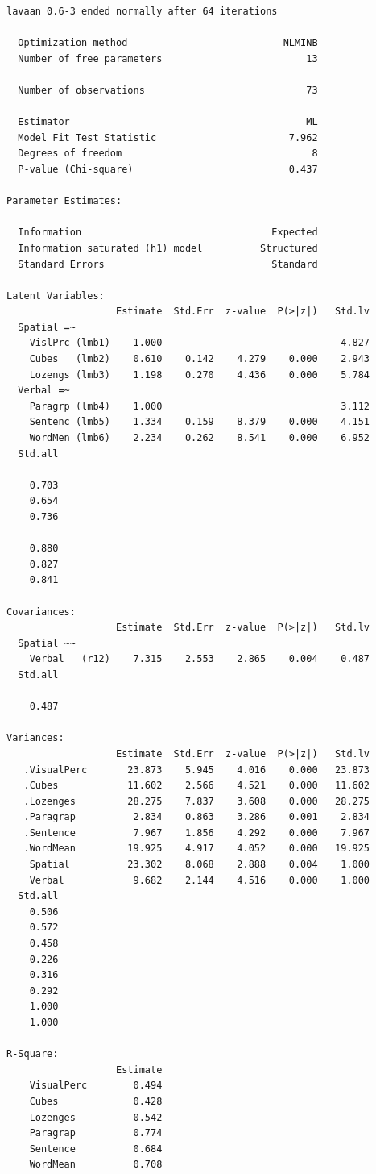 \begin{verbatim}
lavaan 0.6-3 ended normally after 64 iterations

  Optimization method                           NLMINB
  Number of free parameters                         13

  Number of observations                            73

  Estimator                                         ML
  Model Fit Test Statistic                       7.962
  Degrees of freedom                                 8
  P-value (Chi-square)                           0.437

Parameter Estimates:

  Information                                 Expected
  Information saturated (h1) model          Structured
  Standard Errors                             Standard

Latent Variables:
                   Estimate  Std.Err  z-value  P(>|z|)   Std.lv
  Spatial =~                                                   
    VislPrc (lmb1)    1.000                               4.827
    Cubes   (lmb2)    0.610    0.142    4.279    0.000    2.943
    Lozengs (lmb3)    1.198    0.270    4.436    0.000    5.784
  Verbal =~                                                    
    Paragrp (lmb4)    1.000                               3.112
    Sentenc (lmb5)    1.334    0.159    8.379    0.000    4.151
    WordMen (lmb6)    2.234    0.262    8.541    0.000    6.952
  Std.all
         
    0.703
    0.654
    0.736
         
    0.880
    0.827
    0.841

Covariances:
                   Estimate  Std.Err  z-value  P(>|z|)   Std.lv
  Spatial ~~                                                   
    Verbal   (r12)    7.315    2.553    2.865    0.004    0.487
  Std.all
         
    0.487

Variances:
                   Estimate  Std.Err  z-value  P(>|z|)   Std.lv
   .VisualPerc       23.873    5.945    4.016    0.000   23.873
   .Cubes            11.602    2.566    4.521    0.000   11.602
   .Lozenges         28.275    7.837    3.608    0.000   28.275
   .Paragrap          2.834    0.863    3.286    0.001    2.834
   .Sentence          7.967    1.856    4.292    0.000    7.967
   .WordMean         19.925    4.917    4.052    0.000   19.925
    Spatial          23.302    8.068    2.888    0.004    1.000
    Verbal            9.682    2.144    4.516    0.000    1.000
  Std.all
    0.506
    0.572
    0.458
    0.226
    0.316
    0.292
    1.000
    1.000

R-Square:
                   Estimate
    VisualPerc        0.494
    Cubes             0.428
    Lozenges          0.542
    Paragrap          0.774
    Sentence          0.684
    WordMean          0.708
\end{verbatim}

